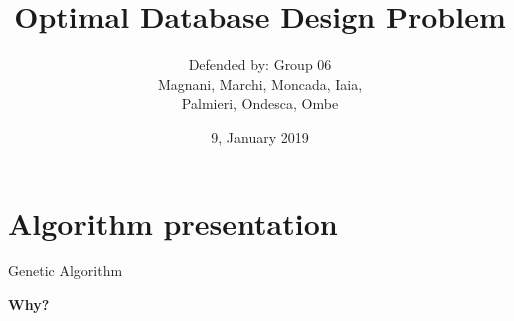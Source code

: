 \documentclass[12pt]{beamer}
\title{Optimal Database Design Problem}
\author{Defended by: Group 06 \texorpdfstring{\\Magnani, Marchi, Moncada, Iaia,}{}\texorpdfstring{\\Palmieri, Ondesca, Ombe}{}}
\date{9, January 2019}
\institute{Politecnico di Torino\\Optimization Methods and Algorithms}
\begin{document}
  \maketitle
  \section{Algorithm presentation}
  {
  \color{white}
  \begin{frame}[fragile]{Genetic Algorithm}
    \begin{center}
      {\fontsize{30}{40}\selectfont \textbf{Why?}}
    \end{center}
  \end{frame}
  }
\end{document}
